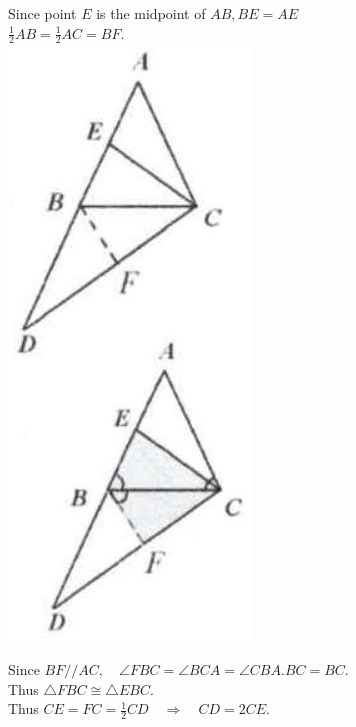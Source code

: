 \documentclass{article}
\begin{document}
Since point \(E\) is the midpoint of \(A B, B E=A E\)\\
\(\frac{1}{2} A B=\frac{1}{2} A C=B F\).\\
\centering
\includegraphics[width=\textwidth]{images/118(2).jpg}

Since \(B F / / A C, \quad \angle F B C=\angle B C A=\angle C B A . B C=B C\).\\
Thus \(\triangle F B C \cong \triangle E B C\).\\
Thus \(C E=F C=\frac{1}{2} C D \quad \Rightarrow \quad C D=2 C E\).
\end{document}
